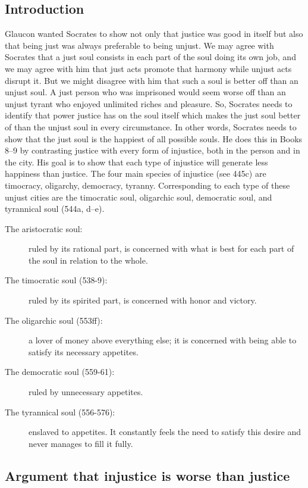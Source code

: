 \documentclass[oneside]{article}
\begin{document}
\subsection*{Introduction}
Glaucon wanted Socrates to show not only that justice was good in
itself but also that being just was always preferable to being unjust. We may agree with Socrates that a just soul consists in each part of the soul doing its own job, and we may agree with him that just acts promote that harmony while unjust acts disrupt it. But we might disagree with him that such a soul is better off than an unjust soul. A just person who was imprisoned would seem worse off than an unjust tyrant who enjoyed unlimited riches and pleasure. So,  Socrates needs to identify that power justice has on the soul itself which makes the just soul better of than the unjust soul in every circumstance. In other words, Socrates needs to show that the just soul is the happiest of all
possible souls. He does this in Books 8--9 by contrasting justice with
every form of injustice, both in the person and in the city. His goal is
to show that each type of injustice will generate less happiness than
justice. The four main species of injustice (see 445c) are timocracy, oligarchy,
democracy, tyranny. Corresponding to each type of these unjust cities are the
timocratic soul, oligarchic soul, democratic soul, and tyrannical soul
(544a, d--e).

\begin{description}
\item[The aristocratic soul:] ruled by its rational part, is concerned with
  what is best for each part of the soul in relation to the whole.
\item[The timocratic soul (538-9):] ruled by its spirited part, is concerned
  with honor and victory.
\item[The oligarchic soul (553ff):] a lover of money above everything else;
  it is concerned with being able to satisfy its necessary appetites.
\item[The democratic soul (559-61):] ruled by unnecessary appetites.
\item[The tyrannical soul (556-576):] enslaved to appetites. It constantly
  feels the need to satisfy this desire and never manages to fill it
  fully.
\end{description}

\subsection*{Argument that injustice is worse than justice}
\end{document}
